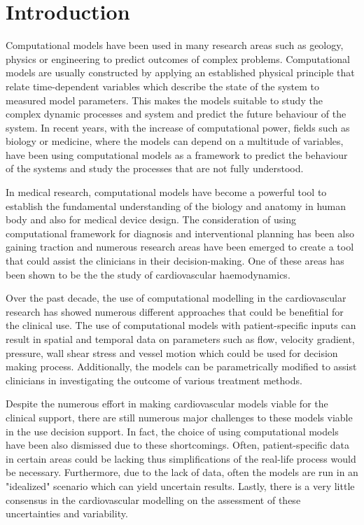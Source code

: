 \chapter{Introduction}
\label{chapterlabel1}

Computational models have been used in many research areas such as geology, physics or engineering to predict outcomes of complex problems. Computational models are usually constructed by applying an established physical principle that relate time-dependent variables which describe the state of the system to measured model parameters. This makes the models suitable to study the complex dynamic processes and system and predict the future behaviour of the system. In recent years, with the increase of computational power, fields such as biology or medicine, where the models can depend on a multitude of variables, have been using computational models as a framework to predict the behaviour of the systems and study the processes that are not fully understood.\par

In medical research, computational models have become a powerful tool to establish the fundamental understanding of the biology and anatomy in human body and also for medical device design. The consideration of using computational framework for diagnosis and interventional planning has been also gaining traction and numerous research areas have been emerged to create a tool that could assist the clinicians in their decision-making. One of these areas has been shown to be the the study of cardiovascular haemodynamics. \par

Over the past decade, the use of computational modelling in the cardiovascular research has showed numerous different approaches that could be benefitial for the clinical use. The use of computational models with patient-specific inputs can result in spatial and temporal data on parameters such as flow, velocity gradient, pressure, wall shear stress and vessel motion which could be used for decision making process. Additionally, the models can be parametrically modified to assist clinicians in investigating the outcome of various treatment methods.

Despite the numerous effort in making cardiovascular models viable for the clinical support, there are still numerous major challenges to these models viable in the use decision support. In fact, the choice of using computational models have been also dismissed due to these shortcomings. Often, patient-specific data in certain areas could be lacking thus simplifications of the real-life process would be necessary. Furthermore, due to the lack of data, often the models are run in an "idealized" scenario which can yield uncertain results. Lastly, there is a very little consensus in the cardiovascular modelling on the assessment of these uncertainties and variability.  \par